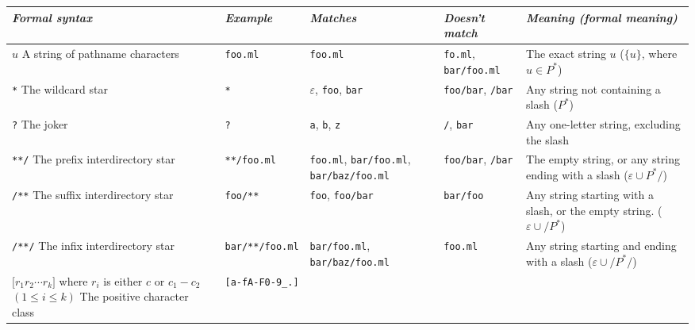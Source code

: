\documentclass[12pt]{article}
\begin{document}
\begin{table}[h]
  \begin{center}
    \small
    \begin{tabular}{|p{3cm}|l|p{3cm}|p{3cm}|p{5cm}|}
    \hline
    {\em Formal syntax} &
    {\em Example} & {\em Matches} & {\em Doesn't match} &
    {\em Meaning (formal meaning)} \\
    \hline
    \hline
    {$u$ \vspace*{0.5em} A string of pathname characters} &
    \texttt{foo.ml} &
    \texttt{foo.ml} &
    \texttt{fo.ml}, \texttt{bar/foo.ml} &
    The exact string $u$
    ($\{ u \}$, where $u \in P^*$) \\
    \hline
    {\texttt{*} \vspace*{0.5em} The wildcard star}&
    \texttt{*}&
    $\varepsilon$, \texttt{foo}, \texttt{bar} &
    \texttt{foo/bar}, \texttt{/bar} &
    Any string not containing a slash
    ($P^*$) \\
    \hline
    {\texttt{?} \vspace*{0.5em} The joker}&
    \texttt{?}&
    \texttt{a}, \texttt{b}, \texttt{z} &
    \texttt{/}, \texttt{bar} &
    Any one-letter string, excluding the slash \\
    \hline
    {\texttt{**/} \vspace*{0.5em} The prefix interdirectory star}&
    \texttt{**/foo.ml}&
    \texttt{foo.ml}, \texttt{bar/foo.ml}, \texttt{bar/baz/foo.ml} &
    \texttt{foo/bar}, \texttt{/bar} &
    The empty string, or any string ending with a slash
    ($\varepsilon \cup P^*\mathtt{/}$) \\
    \hline
    {\texttt{/**} \vspace*{0.5em} The suffix interdirectory star}&
    \texttt{foo/**}&
    \texttt{foo}, \texttt{foo/bar} &
    \texttt{bar/foo} &
    Any string starting with a slash, or the empty string.
    ($\varepsilon \cup \mathtt{/}P^*$) \\
    \hline
    {\texttt{/**/} \vspace*{0.5em} The infix interdirectory star}&
    \texttt{bar/**/foo.ml}&
    \texttt{bar/foo.ml}, \texttt{bar/baz/foo.ml} &
    \texttt{foo.ml} &
    Any string starting and ending with a slash
    ($\varepsilon \cup \mathtt{/}P^*\mathtt{/}$) \\
    \hline
    {$\mathtt{[} r_1 r_2 \cdots r_k \mathtt{]}$
    where $r_i$ is either $c$ or $c_1-c_2$ $(1 \leq i \leq k)$
    \vspace*{0.5em} The positive character class}&
    \texttt{[a-fA-F0-9\_.]}&

\end{tabular}
\end{center}
\end{table}
\end{document}
